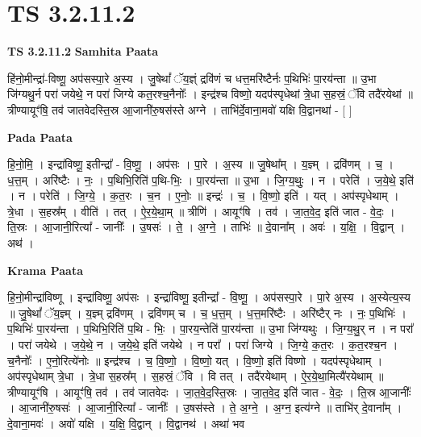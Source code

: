 \documentclass[17pt]{extarticle}
\begin{document}

\section{ TS 3.2.11.2 }

\textbf{TS 3.2.11.2 } \newline
\textbf{Samhita Paata} \newline

हि॑नो॒मीन्द्रा॑-विष्णू॒ अप॑सस्पा॒रे अ॒स्य । जु॒षेथां᳚ ॅय॒ज्ञ्ं द्रवि॑णं च धत्त॒मरि॑ष्टैर्नः प॒थिभिः॑ पा॒रय॑न्ता ॥ उ॒भा जि॑ग्यथु॒र्न परा॑ जयेथे॒ न परा॑ जिग्ये कत॒रश्च॒नैनोः᳚ । इन्द्र॑श्च विष्णो॒ यदप॑स्पृधेथां त्रे॒धा स॒हस्रं॒ ॅवि तदै॑रयेथां ॥ त्रीण्यायूꣳ॑षि॒ तव॑ जातवेदस्ति॒स्र आ॒जानी॑रु॒षस॑स्ते अग्ने । ताभि॑र्दे॒वाना॒मवो॑ यक्षि वि॒द्वानथा॑ - [  ] \newline

\textbf{Pada Paata} \newline

हि॒नो॒मि॒ । इन्द्रा॑विष्णू॒ इतीन्द्रा᳚ - वि॒ष्णू॒ । अप॑सः । पा॒रे । अ॒स्य ॥ जु॒षेथा᳚म् । य॒ज्ञ्म् । द्रवि॑णम् । च॒ । ध॒त्त॒म् । अरि॑ष्टैः । नः॒ । प॒थिभि॒रिति॑ प॒थि-भिः॒ । पा॒रय॑न्ता ॥ उ॒भा । जि॒ग्य॒थुः॒ । न । परेति॑ । ज॒ये॒थे॒ इति॑ । न । परेति॑ । जि॒ग्ये॒ । क॒त॒रः । च॒न । ए॒नोः॒ ॥ इन्द्रः॑ । च॒ । वि॒ष्णो॒ इति॑ । यत् । अप॑स्पृधेथाम् । त्रे॒धा । स॒हस्र᳚म् । वीति॑ । तत् । ऐ॒र॒ये॒था॒म् ॥ त्रीणि॑ । आयूꣳ॑षि । तव॑ । जा॒त॒वे॒द॒ इति॑ जात - वे॒दः॒ । ति॒स्रः । आ॒जानी॒रित्या᳚ - जानीः᳚ । उ॒षसः॑ । ते॒ । अ॒ग्ने॒ । ताभिः॑ ॥ दे॒वाना᳚म् । अवः॑ । य॒क्षि॒ । वि॒द्वान् । अथ॑ ।  \newline


\textbf{Krama Paata} \newline

हि॒नो॒मीन्द्रा॑विष्णू । इन्द्रा॑विष्णू॒ अप॑सः । इन्द्रा॑विष्णू॒ इतीन्द्रा᳚ - वि॒ष्णू॒ । अप॑सस्पा॒रे । पा॒रे अ॒स्य । अ॒स्येत्य॒स्य ॥ जु॒षेथां᳚ ॅय॒ज्ञ्म् । य॒ज्ञ्म् द्रवि॑णम् । द्रवि॑णम् च । च॒ ध॒त्त॒म् । ध॒त्त॒मरि॑ष्टैः । अरि॑ष्टैर् नः । नः॒ प॒थिभिः॑ । प॒थिभिः॑ पा॒रय॑न्ता । प॒थिभि॒रिति॑ प॒थि - भिः॒ । पा॒रय॒न्तेति॑ पा॒रय॑न्ता ॥ उ॒भा जि॑ग्यथुः । जि॒ग्य॒थु॒र् न । न परा᳚ । परा॑ जयेथे । ज॒ये॒थे॒ न । ज॒ये॒थे॒ इति॑ जयेथे । न परा᳚ । परा॑ जिग्ये । जि॒ग्ये॒ क॒त॒रः । क॒त॒रश्च॒न । च॒नैनोः᳚ । ए॒नो॒रित्ये॑नोः ॥ इन्द्र॑श्च । च॒ वि॒ष्णो॒ । वि॒ष्णो॒ यत् । वि॒ष्णो॒ इति॑ विष्णो । यदप॑स्पृधेथाम् । अप॑स्पृधेथाम् त्रे॒धा । त्रे॒धा स॒हस्र᳚म् । स॒हस्रं॒ ॅवि । वि तत् । तदै॑रयेथाम् । ऐ॒र॒ये॒था॒मित्यै॑रयेथाम् ॥ त्रीण्यायूꣳ॑षि । आयूꣳ॑षि॒ तव॑ । तव॑ जातवेदः । जा॒त॒वे॒द॒स्ति॒स्रः । जा॒त॒वे॒द॒ इति॑ जात - वे॒दः॒ । ति॒स्र आ॒जानीः᳚ । आ॒जानी॑रु॒षसः॑ । आ॒जानी॒रित्या᳚ - जानीः᳚ । उ॒षस॑स्ते । ते॒ अ॒ग्ने॒ । अ॒ग्न॒ इत्य॑ग्ने ॥ ताभि॑र् दे॒वाना᳚म् । दे॒वाना॒मवः॑ । अवो॑ यक्षि । य॒क्षि॒ वि॒द्वान् । वि॒द्वानथ॑ । अथा॑ भव \newline
\end{document}
